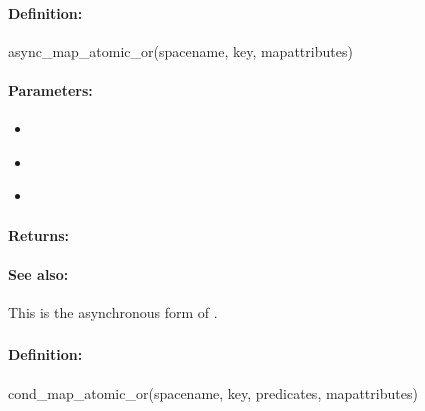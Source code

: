 \paragraph{Definition:}
\begin{rubycode}
async_map_atomic_or(spacename, key, mapattributes)
\end{rubycode}

\paragraph{Parameters:}
\begin{itemize}[noitemsep]
\item {}\\

\item {}\\

\item {}\\

\end{itemize}

\paragraph{Returns:}


\paragraph{See also:}  This is the asynchronous form of .

\pagebreak
\subsubsection{}
\label{api:ruby:cond_map_atomic_or}


\paragraph{Definition:}
\begin{rubycode}
cond_map_atomic_or(spacename, key, predicates, mapattributes)
\end{rubycode}

